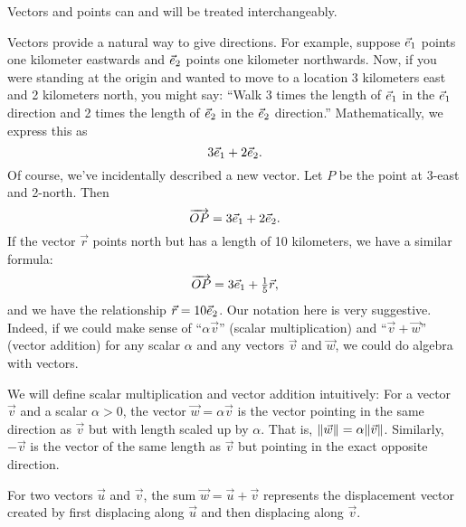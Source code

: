 \begin{emphbox}[Takeaway]
	Vectors and points can and will be treated interchangeably.
\end{emphbox}


Vectors provide a natural way to give directions.
For example, suppose ${\vec e_1}$ points one kilometer eastwards and ${\vec e_2}$
points one kilometer northwards.  Now, if you were standing at the origin
and wanted to move to a location 3 kilometers east and 2 kilometers north, you might say:
``Walk 3 times the length of ${\vec e_1}$  in the ${\vec e_1}$ direction and 2 times
the length of ${\vec e_2}$ in the ${\vec e_2}$ direction.''  Mathematically, we express this
as
\[
	3{\vec e_1}+2{\vec e_2}.
\]
Of course, we've incidentally described a new vector.  Let $P$
be the point at 3-east and 2-north.  Then
\[
	\overrightarrow{OP}=3{\vec e_1}+2{\vec e_2}.
\]
If the vector $\vec r$ points north but has a length of 10 kilometers, we have
a similar formula:
\[
	\overrightarrow{OP}=3{\vec e_1}+\tfrac{1}{5}\vec r,
\]
and we have the relationship $\vec r=10{\vec e_2}$.
Our notation here is very suggestive.  Indeed, if we could make
sense of ``$\alpha\vec v$'' (scalar multiplication) and ``$\vec v+\vec w$'' (vector addition)
for any scalar $\alpha$ and any vectors
$\vec v$ and $\vec w$, we could
do algebra with vectors.

We will define scalar multiplication and vector addition intuitively:
For a vector $\vec v$ and a scalar $\alpha>0$, the
vector $\vec w=\alpha\vec v$ is the vector pointing in the same direction as
$\vec v$ but with length scaled up by $\alpha$.  That is, $\lVert\vec w\rVert=\alpha\lVert\vec v\rVert$.
Similarly, $-\vec v$ is the vector of the same length as $\vec v$ but
pointing in the exact opposite direction.

\begin{center}
	\usetikzlibrary{patterns,decorations.pathreplacing}
\end{center}

For two vectors $\vec u$ and $\vec v$, the sum $\vec w=\vec u+\vec v$ represents
the displacement vector created by first displacing along $\vec u$
and then displacing along $\vec v$.

